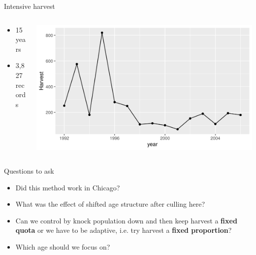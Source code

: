 \documentclass{beamer}
\begin{document}
\begin{frame}{Intensive harvest}
\begin{columns}
	\begin{column}{0.3\textwidth}
		\begin{itemize}
			\item 15 years \pause
			\item 3,827 records
		\end{itemize}
	\end{column}
	\begin{column}{0.7\textwidth}
		\begin{center}
			\includegraphics[width=\textwidth]{fig/Chicago_deer/totalharv.png}      
		\end{center}
	\end{column}
\end{columns}
\end{frame}

\begin{frame}{Questions to ask}
\renewcommand\baselinestretch{1.25}\selectfont
	\begin{itemize}
		
		\item Did this method work in Chicago? \pause
		\item What was the effect of shifted age structure after culling here? \pause
		\item Can we control by knock population down and then keep harvest a \textbf{fixed quota} or we have to be adaptive, i.e. try harvest a \textbf{fixed proportion}? \pause
		\item Which age should we focus on?\pause
	\end{itemize}
\renewcommand\baselinestretch{1}\selectfont
\end{frame}
\end{document}
